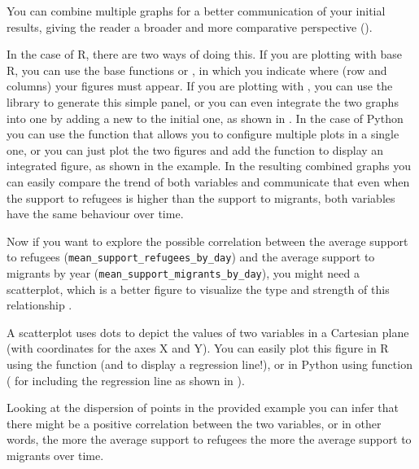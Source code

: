 You can combine multiple graphs for a better communication of your initial results, giving the reader a broader and more comparative perspective (). 


In the case of R, there are two ways of doing this. If you are plotting with base R, you can use the base functions  or , in which you indicate where (row and columns) your figures must appear. If you are plotting with , you can use the library  to generate this simple panel, or you can even integrate the two graphs into one by adding a new  to the initial one, as shown in . In the case of Python you can use the  function  that allows you to configure multiple plots in a single one, or you can just plot the two figures and add the  function  to display an integrated figure, as shown in the example.  In the resulting combined graphs you can easily compare the trend of both variables and communicate that even when the support to refugees is higher than the support to migrants, both variables have the same behaviour over time.


Now if you want to explore the possible correlation between the average support to refugees (\texttt{mean\_support\_refugees\_by\_day}) and the average support to migrants by year (\texttt{mean\_support\_migrants\_by\_day}), you might need a scatterplot, which is a better figure to visualize the type and strength of this relationship . 


A scatterplot uses dots to depict the values of two variables in a Cartesian plane (with coordinates for the axes X and Y). You can easily plot this figure in R using the  function  (and  to display a regression line!), or in Python using  function  ( for including the regression line as shown in ). 


Looking at the dispersion of points in the provided example you can infer that there might be a positive correlation between the two variables, or in other words, the more the average support to refugees the more the average support to migrants over time.

